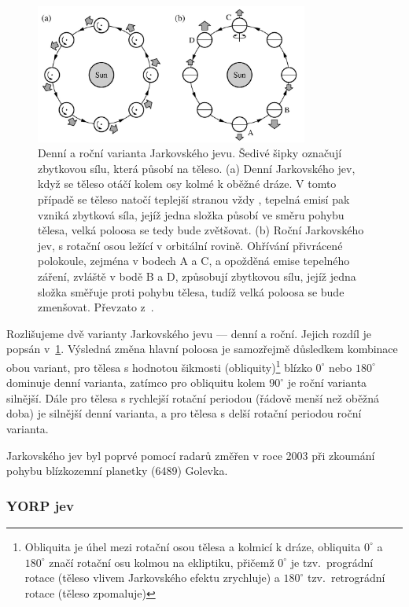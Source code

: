 \documentclass[A4paper, 12pt, oneside]{book}
\begin{document}
\begin{figure} 
	\centering

		\includegraphics[width=0.8\textwidth]{obr/jarkovskeho_jev.png}
	\caption{Denní a roční varianta Jarkovského jevu. Šedivé šipky
	označují zbytkovou sílu, která působí na těleso. (a) Denní Jarkovského jev, když se těleso otáčí kolem osy kolmé k oběžné dráze. V tomto případě se těleso natočí teplejší stranou vždy , tepelná emisí pak vzniká zbytková síla, jejíž jedna složka působí ve směru pohybu tělesa, velká poloosa se tedy bude zvětšovat. (b) Roční Jarkovského jev, s rotační osou ležící v orbitální rovině. Ohřívání přivrácené polokoule, zejména v bodech A a C, a opožděná emise tepelného záření, zvláště v bodě B a D, způsobují zbytkovou sílu, jejíž jedna složka směřuje proti pohybu tělesa, tudíž velká poloosa se bude zmenšovat. Převzato z~\cite{fmt}.} \label{fig:jarko}
\end{figure}

Rozlišujeme dvě varianty Jarkovského jevu --- denní a roční. Jejich rozdíl je popsán v~\ref{fig:jarko}. Výsledná změna hlavní poloosa je samozřejmě důsledkem kombinace obou variant, pro tělesa s hodnotou šikmosti (obliquity)\footnote{Obliquita je úhel mezi rotační osou tělesa a kolmicí k dráze, obliquita $0^\circ$ a $180^\circ$ značí rotační osu kolmou na ekliptiku, přičemž $0^\circ$ je tzv.\ prográdní rotace (těleso vlivem Jarkovského efektu zrychluje) a $180^\circ$ tzv.\ retrográdní rotace (těleso zpomaluje)} blízko $0^\circ$ nebo $180^\circ$ dominuje denní varianta, zatímco pro obliquitu kolem $90^\circ$ je roční varianta silnější. Dále pro tělesa s rychlejší rotační periodou (řádově menší než oběžná doba) je silnější denní varianta, a pro tělesa s delší rotační periodou roční varianta. 

Jarkovského jev byl poprvé pomocí radarů změřen v roce 2003 při zkoumání pohybu blízkozemní planetky (6489) Golevka.~\cite{chesley03}
\subsubsection{YORP jev}
\end{document}
